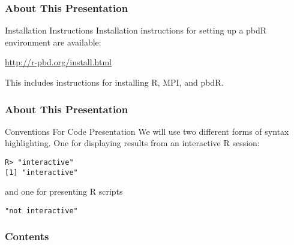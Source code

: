 \begin{frame}
\frametitle{About This Presentation}
 \begin{block}{Installation Instructions}
  Installation instructions for setting up a pbdR environment are available:
  \begin{center}
  \url{http://r-pbd.org/install.html}
  \end{center}
  This includes instructions for installing R, MPI, and pbdR.
 \end{block}
\end{frame}






\begin{frame}[fragile]
\frametitle{About This Presentation}
 \begin{block}{Conventions For Code Presentation}
We will use two different forms of syntax highlighting.  One for displaying results from an interactive R session:
\begin{lstlisting}[backgroundcolor=\color{white},basicstyle=\ttfamily\color{dkgray}\scriptsize,keywordstyle=\color{black}, 
  commentstyle=\color{orange},stringstyle=\color{mauve}]
R> "interactive"
[1] "interactive"
\end{lstlisting}
and one for presenting R scripts
\begin{lstlisting}
"not interactive"
\end{lstlisting}
 \end{block}
\end{frame}



\begin{frame}
\frametitle{Contents}
\small
\tableofcontents[hideallsubsections]
\end{frame}

\setcounter{framenumber}{0}
